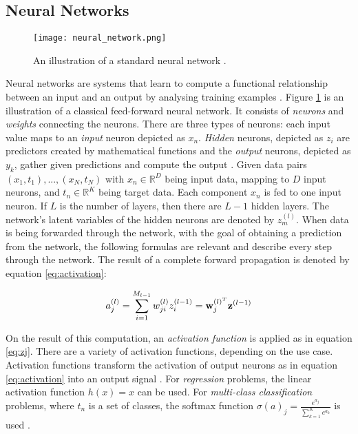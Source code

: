 \subsection{Neural Networks \label{sec:neural-networks}}
\begin{figure}[h]
  \centering
  \texttt{[image: neural\_network.png]}\\
  \caption{An illustration of a standard neural network \cite{hallmachinelearning}.}
  \label{fig:neural_network}
\end{figure}
Neural networks are systems that learn to compute a functional relationship between an input and an output by analysing training examples \cite{sibi2013analysis}. Figure \ref{fig:neural_network} is an illustration of a classical feed-forward neural network. It consists of \textit{neurons} and \textit{weights} connecting the neurons. There are three types of neurons: each input value maps to an \textit{input} neuron depicted as $x_n$. \textit{Hidden} neurons, depicted as $z_i$ are predictors created by mathematical functions and the \textit{output} neurons, depicted as $y_k$, gather given predictions and compute the output \cite{hallmachinelearning}. Given data pairs $(x_1, t_1), ..., (x_N, t_N)$ with $x_n \in \mathbb{R}^D$ being input data, mapping to $D$ input neurons, and $t_n \in \mathbb{R}^K$ being target data. Each component $x_n$ is fed to one input neuron. If $L$ is the number of layers, then there are $L-1$ hidden layers. The network's latent variables of the hidden neurons are denoted by $z_m^{(l)}$. When data is being forwarded through the network, with the goal of obtaining a prediction from the network, the following formulas are relevant and describe every step through the network. The result of a complete forward propagation is denoted by equation \ref{eq:activation}:

\begin{equation}\label{eq:activation}
	a_j^{(l)} = \sum_{i=1}^{M_{l-1}}w_{ji}^{(l)}z_i^{(l-1)} = \bold{w}_j^{(l)^T} \bold{z}^{(l-1)}	
\end{equation}

On the result of this computation, an \textit{activation function} is applied as in equation \ref{eq:zj}. There are a variety of activation functions, depending on the use case. Activation functions transform the activation of output neurons as in equation \ref{eq:activation} into an output signal \cite{sibi2013analysis}. For \textit{regression} problems, the linear activation function $h(x)=x$ can be used. For \textit{multi-class classification} problems, where $t_n$ is a set of classes, the softmax function $\sigma(a)_j= \frac{e^{a_j}}{\sum_{k=1}^Ke^{a_k}}$ is used \cite{hallmachinelearning}.

